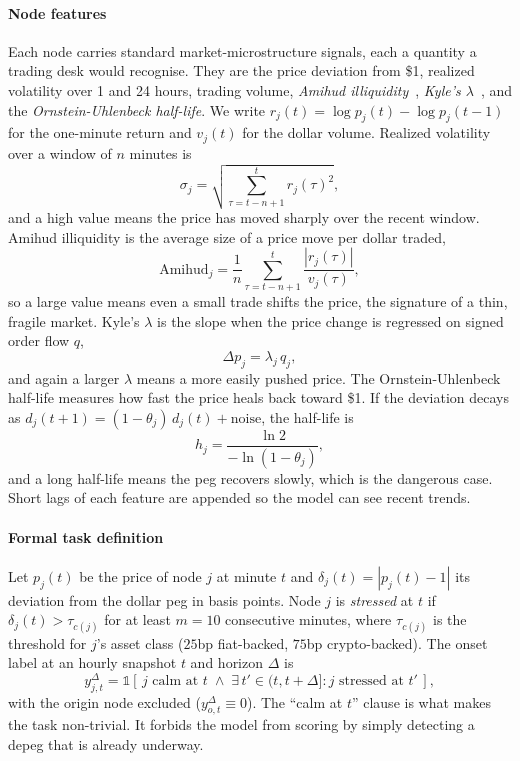 \documentclass[sigconf,anonymous]{acmart}
\begin{document}
\paragraph{Node features} Each node carries standard market-microstructure signals, each a
quantity a trading desk would recognise. They are the price deviation from \$1, realized volatility
over 1 and 24 hours, trading volume, \emph{Amihud illiquidity}~\cite{amihud2002illiquidity},
\emph{Kyle's $\lambda$}~\cite{kyle1985continuous}, and the \emph{Ornstein-Uhlenbeck half-life}. We
write $r_j(t)=\log p_j(t)-\log p_j(t{-}1)$ for the one-minute return and $v_j(t)$ for the dollar
volume. Realized volatility over a window of
$n$ minutes is
\begin{equation}
\sigma_j=\sqrt{\textstyle\sum_{\tau=t-n+1}^{t} r_j(\tau)^2},
\end{equation}
and a high value means the price has moved sharply over the recent window. Amihud illiquidity is the
average size of a price move per dollar traded,
\begin{equation}
\mathrm{Amihud}_j=\frac{1}{n}\sum_{\tau=t-n+1}^{t}\frac{|r_j(\tau)|}{v_j(\tau)},
\end{equation}
so a large value means even a small trade shifts the price, the signature of a thin, fragile market.
Kyle's $\lambda$ is the slope when the price change is regressed on signed order flow $q$,
\begin{equation}
\Delta p_j=\lambda_j\,q_j,
\end{equation}
and again a larger $\lambda$ means a more easily pushed price. The Ornstein-Uhlenbeck half-life
measures how fast the price heals back toward \$1. If the deviation decays as
$d_j(t{+}1)=(1-\theta_j)\,d_j(t)+\text{noise}$, the half-life is
\begin{equation}
h_j=\frac{\ln 2}{-\ln(1-\theta_j)},
\end{equation}
and a long half-life means the peg recovers slowly, which is the dangerous case. Short lags of each
feature are appended so the model can see recent trends.

\paragraph{Formal task definition} Let $p_j(t)$ be the price of node $j$ at minute $t$ and
$\delta_j(t)=|p_j(t)-1|$ its deviation from the dollar peg in basis points. Node $j$ is
\emph{stressed} at $t$ if $\delta_j(t)>\tau_{c(j)}$ for at least $m=10$ consecutive minutes, where
$\tau_{c(j)}$ is the threshold for $j$'s asset class ($25$bp fiat-backed, $75$bp crypto-backed). The
onset label at an hourly snapshot $t$ and horizon $\Delta$ is
\begin{equation}
y_{j,t}^{\Delta}=\mathbb{1}\!\left[\,\text{$j$ calm at $t$}\;\wedge\;\exists\,t'\!\in(t,t{+}\Delta]:\text{$j$ stressed at }t'\,\right],
\end{equation}
with the origin node excluded ($y_{o,t}^{\Delta}\equiv 0$). The ``calm at $t$'' clause is what makes
the task non-trivial. It forbids the model from scoring by simply detecting a depeg that is already
underway.
\end{document}

